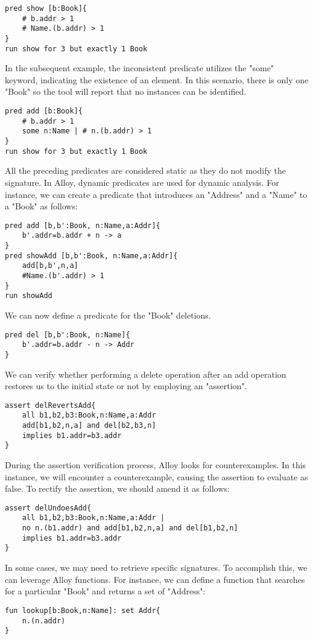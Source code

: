 \begin{lstlisting}[language=alloy]
pred show [b:Book]{
    # b.addr > 1
    # Name.(b.addr) > 1
}
run show for 3 but exactly 1 Book
\end{lstlisting}
In the subsequent example, the inconsistent predicate utilizes the "some" keyword, indicating the existence of an element. 
In this scenario, there is only one "Book" so the tool will report that no instances can be identified.
\begin{lstlisting}[language=alloy]
pred add [b:Book]{
    # b.addr > 1
    some n:Name | # n.(b.addr) > 1
}
run show for 3 but exactly 1 Book
\end{lstlisting}
All the preceding predicates are considered static as they do not modify the signature. 
In Alloy, dynamic predicates are used for dynamic analysis. 
For instance, we can create a predicate that introduces an "Address" and a "Name" to a "Book" as follows:
\begin{lstlisting}[language=alloy]
pred add [b,b':Book, n:Name,a:Addr]{
    b'.addr=b.addr + n -> a
}
pred showAdd [b,b':Book, n:Name,a:Addr]{
    add[b,b',n,a]
    #Name.(b'.addr) > 1
}
run showAdd
\end{lstlisting}
We can now define a predicate for the "Book" deletions.  
\begin{lstlisting}[language=alloy]
pred del [b,b':Book, n:Name]{
    b'.addr=b.addr - n -> Addr
}
\end{lstlisting}
We can verify whether performing a delete operation after an add operation restores us to the initial state or not by employing an "assertion". 
\begin{lstlisting}[language=alloy]
assert delRevertsAdd{
    all b1,b2,b3:Book,n:Name,a:Addr
    add[b1,b2,n,a] and del[b2,b3,n]
    implies b1.addr=b3.addr
}
\end{lstlisting}
During the assertion verification process, Alloy looks for counterexamples. 
In this instance, we will encounter a counterexample, causing the assertion to evaluate as false.
To rectify the assertion, we should amend it as follows:
\begin{lstlisting}[language=alloy]
assert delUndoesAdd{
    all b1,b2,b3:Book,n:Name,a:Addr |
    no n.(b1.addr) and add[b1,b2,n,a] and del[b1,b2,n]
    implies b1.addr=b3.addr
}
\end{lstlisting}
In some cases, we may need to retrieve specific signatures. 
To accomplish this, we can leverage Alloy functions. 
For instance, we can define a function that searches for a particular "Book" and returns a set of "Address":        
\begin{lstlisting}[language=alloy]
fun lookup[b:Book,n:Name]: set Addr{
    n.(n.addr)
}
\end{lstlisting}
